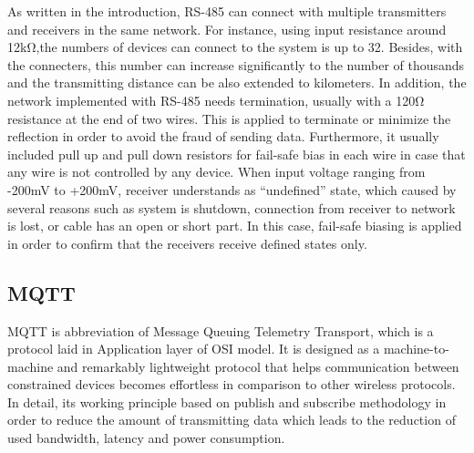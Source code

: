     As written in the introduction, RS-485 can connect with multiple transmitters and receivers in the same network. For instance, using input resistance around 12k\si{\ohm},the numbers of devices can connect to the system is up to 32. Besides, with the connecters, this number can increase significantly to the number of thousands and the transmitting distance can be also extended to kilometers. In addition, the network implemented with RS-485 needs termination, usually with a 120\si{\ohm} resistance at the end of two wires. This is applied to terminate or minimize the reflection in order to avoid the fraud of sending data. Furthermore, it usually included pull up and pull down resistors for fail-safe bias in each wire in case that any wire is not controlled by any device. When input voltage ranging from -200mV to +200mV, receiver understands as “undefined” state, which caused by several reasons such as system is shutdown, connection from receiver to network is lost, or cable has an open or short part. In this case, fail-safe biasing is applied in order to confirm that the receivers receive defined states only.

  \subsection{MQTT}
    MQTT is abbreviation of Message Queuing Telemetry Transport, which is a protocol laid in Application layer of OSI model. It is designed as a machine-to-machine and remarkably lightweight protocol that helps communication between constrained devices becomes effortless in comparison to other wireless protocols. In detail, its working principle based on publish and subscribe methodology in order to reduce the amount of transmitting data which leads to the reduction of used bandwidth, latency and power consumption.

